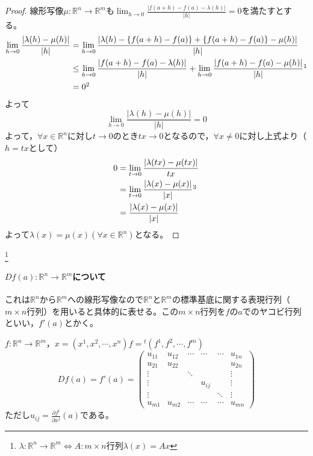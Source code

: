 \begin{proof}
	線形写像$\mu:\mathbb{R}^n\to\mathbb{R}^m$も$\displaystyle \lim_{h\to 0}\frac{|f(a+h)-f(a)-\lambda(h)|}{|h|}=0$を満たすとする。
	\[
	\begin{split}
	\lim_{h\to 0}\frac{|\lambda(h)-\mu(h)|}{|h|}
	&= \lim_{h\to0}\frac{|\lambda(h)-\{f(a+h)-f(a)\}+\{f(a+h)-f(a)\}-\mu(h)|}{|h|}\\
	&\leq\lim_{h\to0}\frac{|f(a+h)-f(a)-\lambda(h)|}{|h|}+\lim_{h\to0}\frac{|f(a+h)-f(a)-\mu(h)|}{|h|}\footnotemark\\
	&= 0\footnotemark
	\end{split}
	\]
	よって
	\[
	\lim_{h\to0}\frac{|\lambda(h)-\mu(h)|}{|h|}=0
	\]
	よって，$\forall x\in\mathbb{R}^n$に対し$t\to0$のとき$tx\to0$となるので，$\forall x\neq0$に対し上式より（$h=tx$として）
	\[
	\begin{split}
	0 &=\lim_{t\to0}\frac{|\lambda(tx)-\mu(tx)|}{tx}\\
	&= \lim_{t\to0}\frac{|\lambda(x)-\mu(x)|}{|x|}\footnotemark\\
	&= \frac{|\lambda(x)-\mu(x)|}{|x|}
	\end{split}
	\]
	よって$\lambda(x)=\mu(x)$$(\forall x\in\mathbb{R}^n)$となる。
\end{proof}

\footnote{$\lambda:\mathbb{R}^n\to\mathbb{R}^m\Leftrightarrow A:m\times n$行列$\lambda(x)=Ax$}

\newpage

\paragraph{$Df(a):\mathbb{R}^n\to\mathbb{R}^m$について}
これは$\mathbb{R}^n$から$\mathbb{R}^m$への線形写像なので$\mathbb{R}^n$と$\mathbb{R}^m$の標準基底に関する表現行列（$m\times n$行列）を用いると具体的に表せる。この$m\times n$行列を$f$の$a$でのヤコビ行列といい，$f'(a)$とかく。

$f:\mathbb{R}^n\to\mathbb{R}^m$，$x=(x^1,x^2,\cdots,x^n)$$f={}^{t}(f^1,f^2,\cdots,f^m)$
\[
Df(a)=f'(a)=
\begin{pmatrix}
u_{11} & u_{12} & \cdots & \cdots & \cdots & u_{1n}\\
u_{21} & u_{22} &        &        &        & u_{2n} \\
\vdots &        & \ddots &        &        & \vdots \\
\vdots &        &        & u_{ij} &        & \vdots \\
\vdots &        &        &        & \ddots & \vdots \\
u_{m1} & u_{m2} & \cdots & \cdots & \cdots & u_{mn}
\end{pmatrix}
\]
ただし$\displaystyle u_{ij}=\frac{\partial f^i}{\partial x^j}(a)$である。

